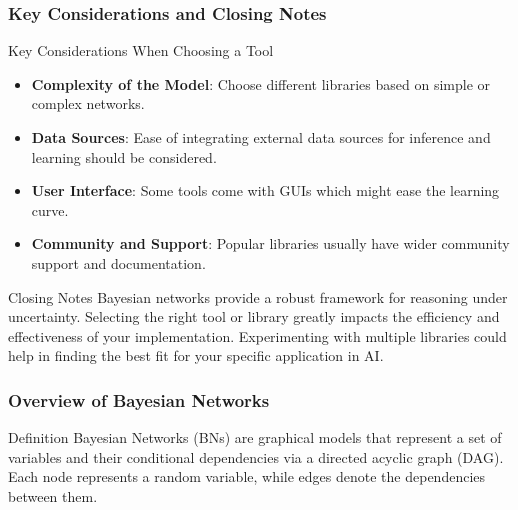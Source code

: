 \documentclass[aspectratio=169]{beamer}
\begin{document}
\begin{frame}[fragile]
    \frametitle{Key Considerations and Closing Notes}
    \begin{block}{Key Considerations When Choosing a Tool}
        \begin{itemize}
            \item \textbf{Complexity of the Model}: Choose different libraries based on simple or complex networks.
            \item \textbf{Data Sources}: Ease of integrating external data sources for inference and learning should be considered.
            \item \textbf{User Interface}: Some tools come with GUIs which might ease the learning curve.
            \item \textbf{Community and Support}: Popular libraries usually have wider community support and documentation.
        \end{itemize}
    \end{block}
    
    \begin{block}{Closing Notes}
        Bayesian networks provide a robust framework for reasoning under uncertainty. Selecting the right tool or library greatly impacts the efficiency and effectiveness of your implementation. Experimenting with multiple libraries could help in finding the best fit for your specific application in AI.
    \end{block}
\end{frame}

\begin{frame}
    \frametitle{Overview of Bayesian Networks}
    \begin{block}{Definition}
        Bayesian Networks (BNs) are graphical models that represent a set of variables and their conditional dependencies via a directed acyclic graph (DAG). Each node represents a random variable, while edges denote the dependencies between them.
    \end{block}
\end{frame}
\end{document}
